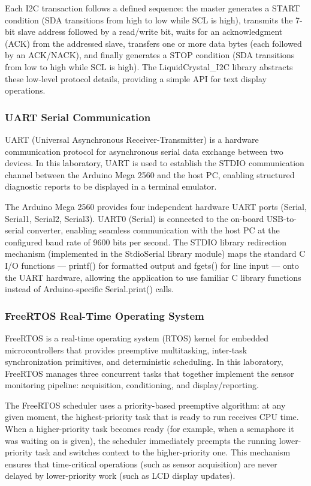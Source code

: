 Each I2C transaction follows a defined sequence: the master generates a START condition (SDA transitions from high to low while SCL is high), transmits the 7-bit slave address followed by a read/write bit, waits for an acknowledgment (ACK) from the addressed slave, transfers one or more data bytes (each followed by an ACK/NACK), and finally generates a STOP condition (SDA transitions from low to high while SCL is high). The LiquidCrystal\_I2C library abstracts these low-level protocol details, providing a simple API for text display operations.

\subsubsection{UART Serial Communication}

UART (Universal Asynchronous Receiver-Transmitter) is a hardware communication protocol for asynchronous serial data exchange between two devices. In this laboratory, UART is used to establish the STDIO communication channel between the Arduino Mega 2560 and the host PC, enabling structured diagnostic reports to be displayed in a terminal emulator.

The Arduino Mega 2560 provides four independent hardware UART ports (Serial, Serial1, Serial2, Serial3). UART0 (Serial) is connected to the on-board USB-to-serial converter, enabling seamless communication with the host PC at the configured baud rate of 9600 bits per second. The STDIO library redirection mechanism (implemented in the StdioSerial library module) maps the standard C I/O functions --- printf() for formatted output and fgets() for line input --- onto the UART hardware, allowing the application to use familiar C library functions instead of Arduino-specific Serial.print() calls.

\subsubsection{FreeRTOS Real-Time Operating System}

FreeRTOS is a real-time operating system (RTOS) kernel for embedded microcontrollers that provides preemptive multitasking, inter-task synchronization primitives, and deterministic scheduling. In this laboratory, FreeRTOS manages three concurrent tasks that together implement the sensor monitoring pipeline: acquisition, conditioning, and display/reporting.

The FreeRTOS scheduler uses a priority-based preemptive algorithm: at any given moment, the highest-priority task that is ready to run receives CPU time. When a higher-priority task becomes ready (for example, when a semaphore it was waiting on is given), the scheduler immediately preempts the running lower-priority task and switches context to the higher-priority one. This mechanism ensures that time-critical operations (such as sensor acquisition) are never delayed by lower-priority work (such as LCD display updates).

